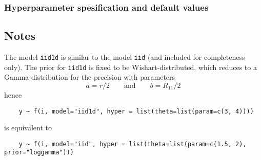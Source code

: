 \documentclass[a4paper,11pt]{article}
\begin{document}
\subsubsection*{Hyperparameter spesification and default values}



\subsection*{Notes}

The model \texttt{iid1d} is similar to the model \texttt{iid} (and
included for completeness only). The prior for \texttt{iid1d} is fixed
to be Wishart-distributed, which reduces to a Gamma-distribution for
the precision with parameters
\begin{displaymath}
    a = r/2 \qquad\text{and}\qquad b = R_{11}/2
\end{displaymath}
hence
\begin{verbatim}
    y ~ f(i, model="iid1d", hyper = list(theta=list(param=c(3, 4))))
\end{verbatim}
is equivalent to
\begin{verbatim}
    y ~ f(i, model="iid", hyper = list(theta=list(param=c(1.5, 2), prior="loggamma")))
\end{verbatim}
\end{document}
